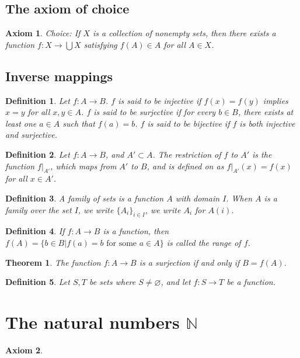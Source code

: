 \documentclass[a4paper]{article}
\newtheorem{mytheorem}{Theorem}
\newtheorem{axiom}{Axiom}
\newtheorem{mydef}{Definition}
\numberwithin{mytheorem}{section}
\numberwithin{mydef}{section}
\numberwithin{axiom}{section}
\numberwithin{example}{section}
\begin{document}
\subsection{The axiom of choice}

\begin{axiom} Choice:  If $X$ is a collection of nonempty sets, then there exists a function $f: X \rightarrow \bigcup X$ satisfying $f(A) \in A$ for all $A \in X$.
\end{axiom}

\subsection{Inverse mappings}

\begin{mydef} Let $f: A \rightarrow B$. $f$ is said to be injective if $f(x) = f(y)$ implies $x=y$ for all $x,y \in A$. $f$ is said to be surjective if for every $b \in B$, there exists at least one $a \in A$ such that $f(a) = b$. $f$ is said to be bijective if $f$ is both injective and surjective.
\end{mydef}

\begin{mydef} Let $f: A \rightarrow B$, and $A' \subset A$. The restriction of $f$ to $A'$ is the function $f|_{A'}$, which maps from $A'$ to $B$, and is defined on as $f|_{A'}(x) = f(x)$ for all $x \in A'$.
\end{mydef}

\begin{mydef} A family of sets is a function $A$ with domain $I$. When $A$ is a family over the set $I$, we write $\{A_{i}\}_{i \in I}$, we write $A_{i}$ for $A(i)$.
\end{mydef}

\begin{mydef} If $f: A \rightarrow B$ is a function, then $f(A) = \{ b \in B | f(a) = b \text { for some } a \in A \} $ is called the range of $f$.
\end{mydef}

\begin{mytheorem} The function $f: A \rightarrow B$ is a surjection if and only if $B = f(A)$. \end{mytheorem}

\begin{mydef} Let $S,T$ be sets where $S \neq \varnothing$, and let $f: S \rightarrow T$ be a function. 
\end{mydef}


\section{The natural numbers $\mathbb{N}$}

\begin{axiom} 

\end{axiom}


\end{document}
